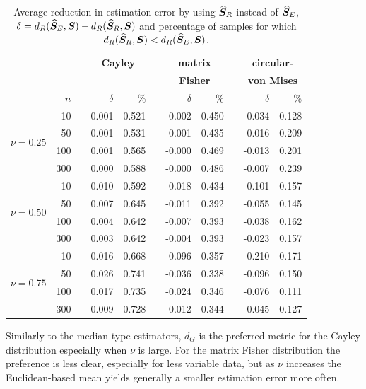 \begin{table}[h!]
\caption{Average reduction in estimation error by using ${\widehat{\bm S}_R}$ instead of ${\widehat{\bm S}_E}$, $\delta={d_R}({\widehat{\bm S}_E},\bm S) - {d_R}({\widehat{\bm S}_R},\bm S)$ and percentage of samples for which ${d_R}({\widehat{\bm S}_R},\bm S) < {d_R}({\widehat{\bm S}_E},\bm S)$.  \label{tab:percL2}}
\begin{center}
\begin{tabular}{rrcrrcrrcrr}
  \hline
  & &&\multicolumn{2}{c}{\textbf{Cayley}} & &\multicolumn{2}{c}{\textbf{matrix} } &&\multicolumn{2}{c}{\textbf{circular-}}\\
    && &\multicolumn{2}{c}{} & &\multicolumn{2}{c}{\textbf{Fisher}} & &\multicolumn{2}{c}{\textbf{von Mises}}\\ 
\rule[2mm]{0mm}{3mm} 
  &  $n$ && $\bar{\delta}$ & \% & & $\bar{\delta}$ & \% & & $\bar{\delta}$ & \% \\ 
  \hline \hline
\multirow{4}{*}{$\nu=0.25$}
  &   10 &&  0.001 & 0.521 &&  -0.002 & 0.450 && -0.034 & 0.128 \\  
  &   50 && 0.001 & 0.531 &&  -0.001 & 0.435 && -0.016 & 0.209 \\\ 
  &  100 && 0.001 & 0.565 &&  -0.000 & 0.469 && -0.013 & 0.201 \\
  &  300 && 0.000 & 0.588 &&  -0.000 & 0.486 &&  -0.007 & 0.239 \\ \hline
  \multirow{4}{*}{$\nu=0.50$}
   &   10 &&   0.010 & 0.592 &&  -0.018 & 0.434 &&  -0.101 & 0.157 \\ 
   &   50 &&  0.007 & 0.645 &&  -0.011 & 0.392 &&  -0.055 & 0.145 \\ 
   &  100 &&   0.004 & 0.642 &&  -0.007 & 0.393 &&  -0.038 & 0.162 \\ 
   &  300 &&   0.003 & 0.642 &&  -0.004 & 0.393 &&  -0.023 & 0.157 \\ \hline
  \multirow{4}{*}{$\nu=0.75$}
   &   10 &&   0.016 & 0.668 &&  -0.096 & 0.357 &&  -0.210 & 0.171 \\ 
   &   50 &&  0.026 & 0.741 &&  -0.036 & 0.338 &&  -0.096 & 0.150 \\
   &  100 &&  0.017 & 0.735 &&  -0.024 & 0.346 &&  -0.076 & 0.111 \\ 
   &  300 &&  0.009 & 0.728 &&  -0.012 & 0.344 && -0.045 & 0.127 \\ 
   \hline
\end{tabular}
\end{center}
\end{table}

Similarly to the median-type estimators, $d_{G}$ is the preferred metric for the Cayley distribution especially when $\nu$ is large.  For the  matrix Fisher distribution the preference is less clear, especially for less variable data, but as $\nu$ increases the Euclidean-based mean yields generally a smaller estimation error more often. \\
 
